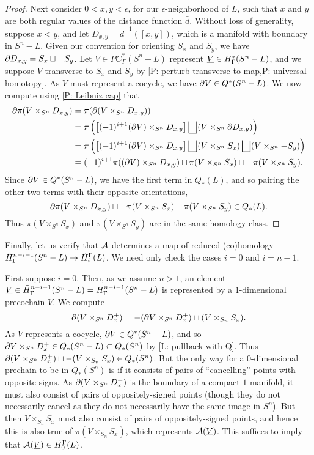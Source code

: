 \begin{proof}
	Next consider $0 < x, y < \epsilon$, for our $\epsilon$-neighborhood of $L$, such that $x$ and $y$ are both regular values of the distance function $\bar d$.
	Without loss of generality, suppose $x < y$, and let $D_{x,y} = \bar d^{-1}([x,y])$, which is a manifold with boundary in $S^n-L$.
	Given our convention for orienting $S_x$ and $S_y$, we have $\partial D_{x,y} = S_x \sqcup -S_y$.
	Let $V \in PC^*_\Gamma(S^n-L)$ represent $\underline{V} \in H^*_\Gamma(S^n - L)$, and we suppose $V$ transverse to $S_x$ and $S_y$ by \cref{P: perturb transverse to map,P: universal homotopy}.
	As $V$ must represent a cocycle, we have $\partial V \in Q^*(S^n - L)$.
	We now compute using \cref{P: Leibniz cap} that
	\begin{align*}
		\partial \pi(V \times_{S^n} D_{x,y}) &= \pi(\partial (V \times_{S^n} D_{x,y}))\\
		&= \pi\left(\left[(-1)^{i+1} (\partial V) \times_{S^n}D_{x,y} \right] \bigsqcup (V \times_{S^n} \partial D_{x,y})\right)\\
		&= \pi\left(\left[(-1)^{i+1} (\partial V) \times_{S^n}D_{x,y} \right] \bigsqcup (V \times_{S^n} S_x)\bigsqcup (V \times_{S^n} -S_y)\right)\\
		&=(-1)^{i+1} \pi((\partial V) \times_{S^n}D_{x,y}) \sqcup \pi(V \times_{S^n} S_x) \sqcup -\pi(V \times_{S^n} S_y).
	\end{align*}
	Since $\partial V \in Q^*(S^n-L)$, we have the first term in $Q_*(L)$, and so pairing the other two terms with their opposite orientations,
	$$\partial \pi(V \times_{S^n} D_{x,y})\sqcup -\pi(V \times_{S^n} S_x) \sqcup \pi(V \times_{S^n} S_y) \in Q_*(L).$$
	Thus $\pi(V \times_{S^n} S_x)$ and $\pi(V \times_{S^n} S_y)$ are in the same homology class.
\end{proof}

Finally, let us verify that $\mathcal{A}$ determines a map of reduced (co)homology $\tilde H^{n-i-1}_\Gamma(S^n-L) \to \tilde H_i^\Gamma(L)$.
We need only check the cases $i = 0$ and $i = n-1$.

First suppose $i = 0$.
Then, as we assume $n > 1$, an element $\underline{V} \in \tilde H^{n-i-1}_\Gamma(S^n-L) = H^{n-i-1}_\Gamma(S^n-L)$ is represented by a $1$-dimensional precochain $V$.
We compute
$$\partial(V \times_{S^n} D^+_x) = -(\partial V \times_{S^n} D^+_x) \sqcup (V \times_{S_n} S_x).$$
As $V$ represents a cocycle, $\partial V \in Q^*(S^n-L)$, and so $\partial V \times_{S^n} D^+_x \in Q_*(S^n-L) \subset Q_*(S^n)$ by \cref{L: pullback with Q}.
Thus $\partial(V \times_{S^n} D^+_x) \sqcup -(V \times_{S_n} S_x) \in Q_*(S^n)$.
But the only way for a $0$-dimensional prechain to be in $Q_*(S^n)$ is if it consists of pairs of ``cancelling'' points with opposite signs.
As $\partial(V \times_{S^n} D^+_x)$ is the boundary of a compact $1$-manifold, it must also consist of pairs of oppositely-signed points (though they do not necessarily cancel as they do not necessarily have the same image in $S^n$).
But then $V \times_{S_n} S_x$ must also consist of pairs of oppositely-signed points, and hence this is also true of $\pi(V \times_{S_n} S_x)$, which represents $\mathcal{A}(\underline{V})$.
This suffices to imply that $\mathcal{A}(\underline{V}) \in \tilde H_0^\Gamma(L)$.

